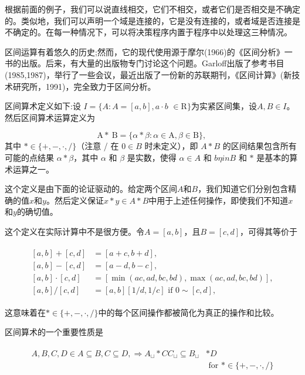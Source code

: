 \begin{CJK}{UTF8}{gbsn}
根据前面的例子，我们可以说直线相交，它们不相交，或者它们是否相交是不确定的。类似地，我们可以声明一个域是连接的，它是没有连接的，或者域是否连接是不确定的。在每一种情况下，可以将决策程序内置于程序中以处理这三种情况。


区间运算有着悠久的历史;然而，它的现代使用源于摩尔(1966)的《区间分析》一书的出版。后来，有大量的出版物专门讨论这个问题。Garloff出版了参考书目(1985,1987)，举行了一些会议，最近出版了一份新的苏联期刊，《区间计算》(新技术研究所，1991)，完全致力于区间分析。

区间算术定义如下:设 $I=\{A: A=[a, b], a \cdot b$ $\in \mathrm{R}\}$为实紧区间集，设$A, B \in I$。然后区间算术运算定义为

$$
\mathrm{A} * \mathrm{~B}=\{\alpha * \beta: \alpha \in \mathrm{A}, \beta \in \mathrm{B}\} \text {, }
$$
其中 $* \in\{+,-, \cdot, /\}$（注意 / 在 $0 \in B$ 时未定义），即 $A * B$ 的区间结果包含所有可能的点结果 $\alpha * \beta$，其中 $\alpha$ 和 $\beta$ 是实数，使得 $\alpha \in A$ 和 $b\eta in B$ 和 $*$ 是基本的算术运算之一。

这个定义是由下面的论证驱动的。给定两个区间$A$和$B$，我们知道它们分别包含精确的值$x$和$y$。然后定义保证$x * y \in A * B$中用于上述任何操作，即使我们不知道$x$和$y$的确切值。

这个定义在实际计算中不是很方便。令$A=[a, b]$，且$ B=[c, d]$，可得其等价于

\begin{align}
\begin{aligned}
{[a, b]+[c, d]}  &=[a+c, b+d], \\
[a, b]-[c, d]  &=[a-d, b-c], \\
[a, b] \cdot [c, d] &=[\min (a c, a d, b c, b d), \max (a c, a d, b c, b d)], \\
[a, b]/[c, d]  &=[a, b][1 / d, 1 / c] \text { if } 0 \sim[c, d],
\end{aligned}
\end{align}

这意味着在$* \in\{+,-, \cdot, /\}$中的每个区间操作都被简化为真正的操作和比较。


区间算术的一个重要性质是


\begin{align}
\begin{aligned}
A, B, C, D \in A \subseteq B, C \subseteq D, \Rightarrow A_{\sqcup} * C C_{\sqcup} \subseteq B_{\sqcup} & * D \\
& \text { for } * \in\{+,-, \cdot, /\}
\end{aligned}
\end{align}


\end{CJK}

